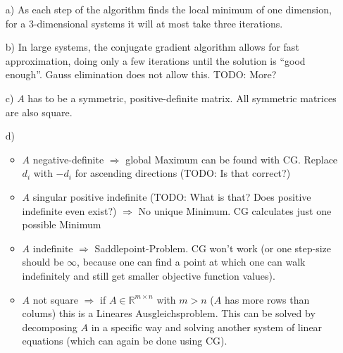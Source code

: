 \documentclass[10pt,DIV10,a4paper]{scrartcl}
\begin{document}
\begin{itemize}
    \item[a)] As each step of the algorithm finds the local minimum of one dimension, for a 3-dimensional systems it will at most take three iterations.
    \item[b)] In large systems, the conjugate gradient algorithm allows for fast approximation, doing only a few iterations until the solution is “good enough”. Gauss elimination does not allow this. TODO: More?
    \item[c)] $A$ has to be a symmetric, positive-definite matrix. All symmetric matrices are also square.
    \item[d)] 
    \begin{itemize}
    \item $A$ negative-definite $\Rightarrow$ global Maximum can be found with CG. Replace $d_i$ with $-d_i$ for ascending directions (TODO: Is that correct?)
    \item $A$ singular positive indefinite (TODO: What is that? Does positive indefinite even exist?) $\Rightarrow$ No unique Minimum. CG calculates just one possible Minimum
    \item $A$ indefinite $\Rightarrow$ Saddlepoint-Problem. CG won't work (or one step-size should be $\infty$, because one can find a point at which one can walk indefinitely and still get smaller objective function values).
    \item $A$ not square $\Rightarrow$ if $A \in \mathbb{R}^{m\times n}$ with $m > n$ ($A$ has more rows than colums) this is a \glqq Lineares Ausgleichsproblem\grqq . This can be solved by decomposing $A$ in a specific way and solving another system of linear equations (which can again be done using CG).
    \end{itemize}
\end{itemize}
\end{document}
